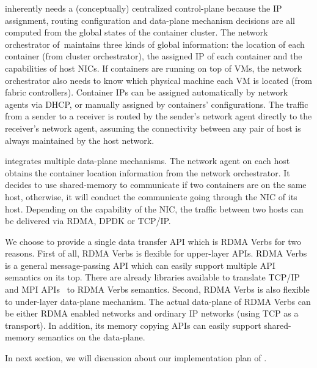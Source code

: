  \sysname inherently needs a (conceptually)
centralized control-plane because the IP assignment, routing configuration and 
data-plane mechanism decisions are all computed from the global states of the
container cluster. The network orchestrator of~\sysname maintains three kinds
of global information: the location of each container (from cluster orchestrator), the assigned IP of each
container and the capabilities of host NICs. If containers are running on top of
VMs, the network orchestrator also needs to know which physical machine each VM 
is located (from fabric controllers). Container IPs can be assigned 
automatically by network agents via DHCP, or manually assigned by containers' 
configurations. The traffic from a sender
to a receiver is routed by the sender's network agent directly to 
the receiver's network agent, assuming the connectivity between
any pair of host is always maintained by the host network. 

 \sysname integrates multiple data-plane 
mechanisms. The network agent on each host 
obtains the container location information from the network orchestrator. 
It decides to use shared-memory to communicate if two containers are on the
same host, otherwise, it will conduct the communicate going through 
the NIC of its host. Depending on the capability of the NIC, the traffic 
between two hosts can be delivered via RDMA, DPDK or TCP/IP.

We choose to provide a single data transfer API which is RDMA Verbs for two
reasons. First of all, RDMA Verbs is flexible for upper-layer APIs.
RDMA Verbs is a general message-passing API which can 
easily support multiple API semantics on its top. There are already libraries
available to translate TCP/IP~\cite{?} and MPI APIs~\cite{?} to RDMA Verbs 
semantics. 
Second, RDMA Verbs is also flexible to under-layer data-plane mechanism. 
The actual data-plane of RDMA Verbs can be either RDMA enabled networks and 
ordinary IP networks (using TCP as a transport). 
In addition, its memory copying APIs can 
easily support shared-memory semantics on the data-plane. 

In next section, we will discussion about our implementation plan of \sysname.


